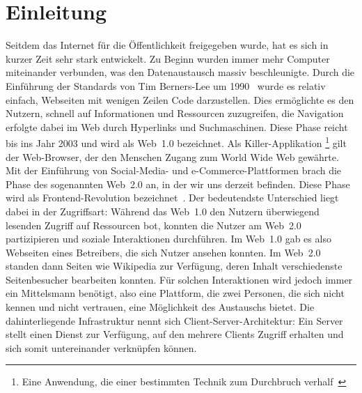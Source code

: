 \section{Einleitung}

Seitdem das Internet für die Öffentlichkeit freigegeben wurde, hat es sich in kurzer Zeit sehr
stark entwickelt. Zu Beginn wurden immer mehr Computer miteinander verbunden, was den
Datenaustausch massiv beschleunigte. Durch die Einführung der Standards von Tim Berners-Lee um 1990~\cite{Krause.2008} wurde es relativ einfach, Webseiten mit wenigen Zeilen Code
darzustellen. Dies ermöglichte es den Nutzern, schnell auf Informationen und Ressourcen
zuzugreifen, die Navigation erfolgte dabei im Web durch Hyperlinks und Suchmaschinen. Diese
Phase reicht bis ins Jahr 2003 und wird als Web~1.0 bezeichnet. Als Killer-Applikation
\footnote{
	\label{footnote:KillerAnwendung}Eine Anwendung, die einer bestimmten Technik zum Durchbruch verhalf~\cite{Duden.2019}
}
gilt der Web-Browser, der den Menschen Zugang zum World Wide Web gewährte. Mit der Einführung
von Social-Media- und e-Commerce-Plattformen brach die Phase des sogenannten Web~2.0 an,
in der wir uns derzeit befinden. Diese Phase wird als Frontend-Revolution bezeichnet~\cite[S. 23]{Voshmgir.2019}. Der bedeutendste Unterschied liegt dabei in der Zugriffsart: Während
das Web~1.0 den Nutzern überwiegend lesenden Zugriff auf Ressourcen bot, konnten die Nutzer
am Web~2.0 partizipieren und soziale Interaktionen durchführen. Im Web~1.0 gab es also Webseiten eines Betreibers, die sich Nutzer ansehen konnten. Im Web~2.0 standen dann Seiten wie Wikipedia zur Verfügung, deren Inhalt verschiedenste Seitenbesucher bearbeiten konnten. Für solchen Interaktionen wird jedoch immer ein Mittelsmann benötigt, also eine Plattform, die zwei Personen, die sich nicht kennen und nicht vertrauen, eine Möglichkeit des Austauschs bietet. Die dahinterliegende Infrastruktur nennt sich Client-Server-Architektur: Ein Server stellt einen Dienst zur Verfügung, auf den mehrere Clients Zugriff erhalten und sich somit untereinander verknüpfen können.

\smallskip

